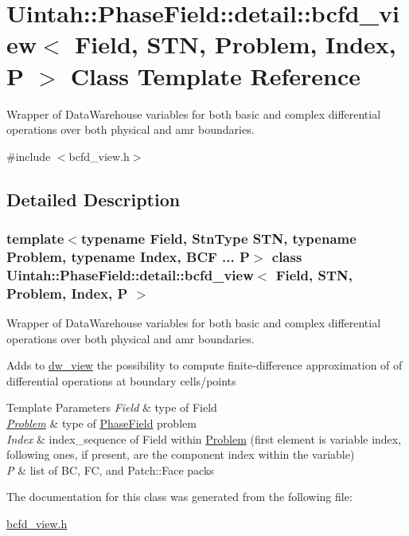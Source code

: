 \hypertarget{classUintah_1_1PhaseField_1_1detail_1_1bcfd__view}{}\section{Uintah\+:\+:Phase\+Field\+:\+:detail\+:\+:bcfd\+\_\+view$<$ Field, S\+TN, Problem, Index, P $>$ Class Template Reference}
\label{classUintah_1_1PhaseField_1_1detail_1_1bcfd__view}


Wrapper of Data\+Warehouse variables for both basic and complex differential operations over both physical and amr boundaries.  




{\ttfamily \#include $<$bcfd\+\_\+view.\+h$>$}



\subsection{Detailed Description}
\subsubsection*{template$<$typename Field, Stn\+Type S\+TN, typename Problem, typename Index, B\+C\+F ... P$>$\newline
class Uintah\+::\+Phase\+Field\+::detail\+::bcfd\+\_\+view$<$ Field, S\+T\+N, Problem, Index, P $>$}

Wrapper of Data\+Warehouse variables for both basic and complex differential operations over both physical and amr boundaries. 

Adds to \hyperlink{classUintah_1_1PhaseField_1_1detail_1_1dw__view}{dw\+\_\+view} the possibility to compute finite-\/difference approximation of of differential operations at boundary cells/points


\begin{DoxyTemplParams}{Template Parameters}
{\em Field} & type of Field \\
\hline
{\em \hyperlink{classUintah_1_1PhaseField_1_1Problem}{Problem}} & type of \hyperlink{namespaceUintah_1_1PhaseField}{Phase\+Field} problem \\
\hline
{\em Index} & index\+\_\+sequence of Field within \hyperlink{classUintah_1_1PhaseField_1_1Problem}{Problem} (first element is variable index, following ones, if present, are the component index within the variable) \\
\hline
{\em P} & list of BC, FC, and Patch\+::\+Face packs \\
\hline
\end{DoxyTemplParams}


The documentation for this class was generated from the following file\+:\begin{DoxyCompactItemize}
\item 
\hyperlink{bcfd__view_8h}{bcfd\+\_\+view.\+h}\end{DoxyCompactItemize}
